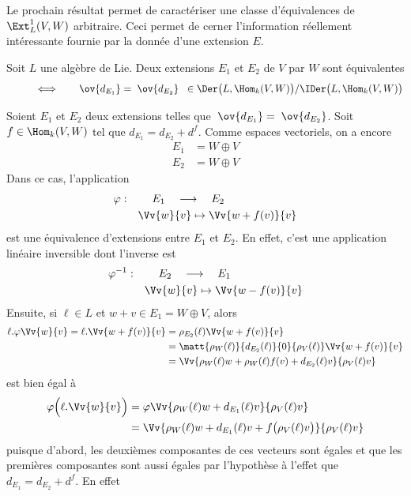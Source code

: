 Le prochain résultat permet de caractériser une classe d'équivalences de $\Ext_L^1(V,W)$ arbitraire. Ceci permet de cerner l'information réellement intéressante fournie par la donnée d'une extension $E$.

\begin{Prop} \label{dercohomo} Soit $L$ une algèbre de Lie. Deux extensions $E_1$ et $E_2$ de $V$ par $W$ sont équivalentes
$$ \qquad \quad \Longleftrightarrow \qquad \ov{d_{E_1}} = \; \ov{d_{E_2}} \;\; \in \Der\big(L,\Hom_k(V,W)\big) / \IDer\big(L,\Hom_k(V,W)\big) $$
\begin{pre} Soient $E_1$ et $E_2$ deux extensions telles que $\; \ov{d_{E_1}} = \; \ov{d_{E_2}}$. Soit $f \in \Hom_k(V,W)$ tel que $d_{E_1} = d_{E_2} + d^f$. Comme espaces vectoriels, on a encore
\begin{align*}
E_1 &= W \oplus V \\
E_2 &= W \oplus V
\end{align*}
Dans ce cas, l'application 
\begin{align*}
\varphi : \quad &\quad\; E_1 \quad \longrightarrow \quad E_2\\
&\Vv{w}{v} \mapsto \Vv{w+f(v)}{v}
\end{align*}
est une équivalence d'extensions entre $E_1$ et $E_2$. En effet, c'est une application linéaire inversible dont l'inverse est 
\begin{align*}
\varphi^{-1} : \quad &\quad\; E_2 \quad \longrightarrow \quad E_1\\
&\Vv{w}{v} \mapsto \Vv{w-f(v)}{v}
\end{align*}
Ensuite, si $\ell \in L$ et $w + v \in E_1 = W \oplus V$, alors
\begin{align*}
\ell.\varphi \Vv{w}{v} = \ell.\Vv{w + f(v)}{v} &= \rho_{E_2}(\ell)\Vv{w + f(v)}{v}\\
&= \matt{\rho_W(\ell)}{d_{E_2}(\ell)}{0}{\rho_V(\ell)}\Vv{w + f(v)}{v}\\
&= \Vv{\rho_W(\ell)w + \rho_W(\ell)f(v) + d_{E_2}(\ell)v}{\rho_V(\ell)v}
\end{align*}
est bien égal à 
\begin{align*}
\varphi\Big(\ell.\Vv{w}{v}\Big) &= \varphi\Vv{\rho_W(\ell)w + d_{E_1}(\ell)v}{\rho_V(\ell)v}\\ 
&= \Vv{\rho_W(\ell)w + d_{E_1}(\ell)v + f\big(\rho_V(\ell)v\big)}{\rho_V(\ell)v}
\end{align*}
puisque d'abord, les deuxièmes composantes de ces vecteurs sont égales et que les premières composantes sont aussi égales par l'hypothèse à l'effet que $d_{E_1} = d_{E_2} + d^f$. En effet

\end{pre}
\end{Prop}
